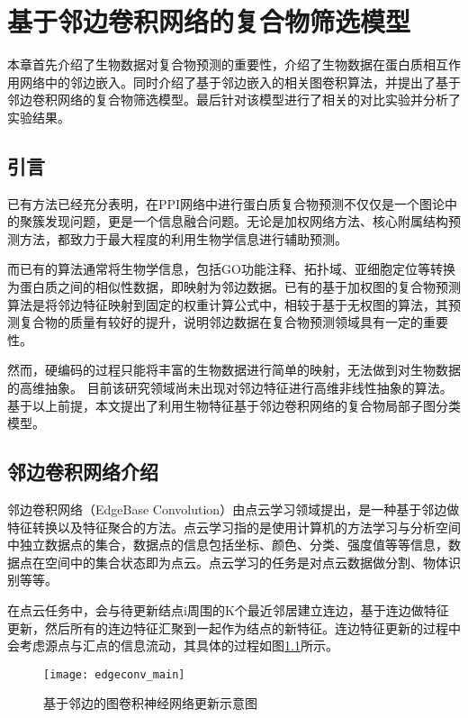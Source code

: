 \chapter{基于邻边卷积网络的复合物筛选模型}
\label{chapter:EdgeConv}

本章首先介绍了生物数据对复合物预测的重要性，介绍了生物数据在蛋白质相互作用网络中的邻边嵌入。同时介绍了基于邻边嵌入的相关图卷积算法，并提出了基于邻边卷积网络的复合物筛选模型。最后针对该模型进行了相关的对比实验并分析了实验结果。

\section{引言}
\label{section:EdgeConv:Put}

已有方法已经充分表明，在PPI网络中进行蛋白质复合物预测不仅仅是一个图论中的聚簇发现问题，更是一个信息融合问题。无论是加权网络方法、核心附属结构预测方法，都致力于最大程度的利用生物学信息进行辅助预测。

而已有的算法通常将生物学信息，包括GO功能注释、拓扑域、亚细胞定位等转换为蛋白质之间的相似性数据，即映射为邻边数据。已有的基于加权图的复合物预测算法是将邻边特征映射到固定的权重计算公式中，相较于基于无权图的算法，其预测复合物的质量有较好的提升，说明邻边数据在复合物预测领域具有一定的重要性。

然而，硬编码的过程只能将丰富的生物数据进行简单的映射，无法做到对生物数据的高维抽象。
目前该研究领域尚未出现对邻边特征进行高维非线性抽象的算法。
基于以上前提，本文提出了利用生物特征基于邻边卷积网络的复合物局部子图分类模型。

\section{邻边卷积网络介绍}
\label{section:EdgeConv:intro}

邻边卷积网络\cite{wang_dynamic_2019}（EdgeBase Convolution）由点云学习领域提出，是一种基于邻边做特征转换以及特征聚合的方法。点云学习指的是使用计算机的方法学习与分析空间中独立数据点的集合，数据点的信息包括坐标、颜色、分类、强度值等等信息，数据点在空间中的集合状态即为点云。点云学习的任务是对点云数据做分割、物体识别等等。

在点云任务中，会与待更新结点i周围的K个最近邻居建立连边，基于连边做特征更新，然后所有的连边特征汇聚到一起作为结点的新特征。连边特征更新的过程中会考虑源点与汇点的信息流动，其具体的过程如图\ref{fig:edgeconv_main}所示。
\begin{figure}[htbp]
    \centering
    \texttt{[image: edgeconv\_main]}
    \caption{基于邻边的图卷积神经网络更新示意图\cite{wang_dynamic_2019}}
    \label{fig:edgeconv_main}
\end{figure}

